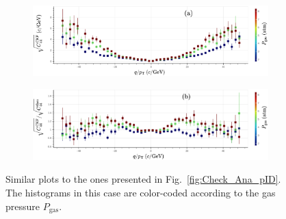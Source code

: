\begin{figure}[!ht]
     \centering
     \begin{subfigure}[b]{0.99\textwidth}
         \centering
         \includegraphics[width=\textwidth]{figures/ch5-KF_NDGAr/ToySample/ParScan/TotVSExpVSdens_noNorm_label.eps}
         \caption{}
         \label{fig:CheckAna_dens_noNorm}
     \end{subfigure}
     \begin{subfigure}[b]{0.99\textwidth}
         \centering
         \includegraphics[width=\textwidth]{figures/ch5-KF_NDGAr/ToySample/ParScan/TotVSExpVSdens_label.eps}
         \caption{}
         \label{fig:CheckAna_dens_Norm}
     \end{subfigure}
        \caption[Similar plots to the ones presented in Fig.~\ref{fig:Check_Ana_pID}. The histograms in this case are color-coded according to the gas pressure $P_{\textrm{gas}}$.]{ Similar plots to the ones presented in Fig.~\ref{fig:Check_Ana_pID}. The histograms in this case are color-coded according to the gas pressure $P_{\textrm{gas}}$.}
        \label{fig:CheckAna_dens}
\end{figure}
